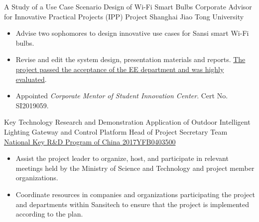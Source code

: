 \documentclass[11pt,a4paper]{moderncv/moderncv}
\begin{document}
{A Study of a Use Case Scenario Design of Wi-Fi Smart Bulbs}
{Corporate Advisor for Innovative Practical Projects (IPP) Project}
{Shanghai Jiao Tong University}{}
{
\begin{itemize}
	\item Advise two sophomores to design innovative use cases for Sansi smart Wi-Fi bulbs.
	\item Revise and edit the system design, presentation materials and reports. \href{https://bingcheng1998.github.io/zh-CN/制作/sansi全彩灯泡的app设计.html}{The project passed the acceptance of the EE department and was highly evaluated}.
	\item Appointed \textit{Corporate Mentor of Student Innovation Center}. Cert No. SI2019059.
\end{itemize}
}

{Key Technology Research and Demonstration Application of Outdoor Intelligent Lighting Gateway and Control Platform}
{Head of Project Secretary Team}
{\href{http://service.most.gov.cn/u/cms/static/201706/05145323ywhn.pdf}{National Key R\&D Program of China 2017YFB0403500}}{}
{
\begin{itemize}
	\item Assist the project leader to organize, host, and participate in relevant meetings held by the Ministry of Science and Technology and project member organizations.
	\item Coordinate resources in companies and organizations participating the project and departments within Sansitech to ensure that the project is implemented according to the plan.
\end{itemize}
}


\end{document}
